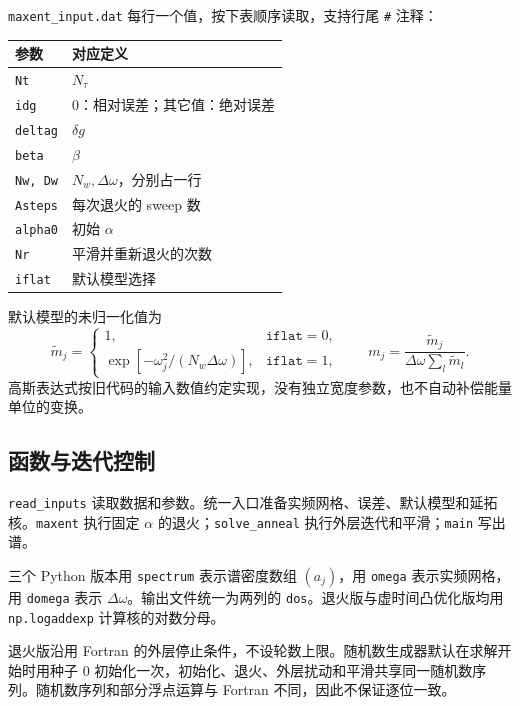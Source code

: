 \documentclass[UTF8,fontset=fandol,11pt]{ctexart}
\begin{document}
\texttt{maxent\_input.dat} 每行一个值，按下表顺序读取，支持行尾 \texttt{\#} 注释：
\begin{center}
    \begin{tabular}{ll}
        \toprule
        参数 & 对应定义\\
        \midrule
        \texttt{Nt} & $N_\tau$\\
        \texttt{idg} & 0：相对误差；其它值：绝对误差\\
        \texttt{deltag} & $\delta g$\\
        \texttt{beta} & $\beta$\\
        \texttt{Nw, Dw} & $N_w,\Delta\omega$，分别占一行\\
        \texttt{Asteps} & 每次退火的 sweep 数\\
        \texttt{alpha0} & 初始 $\alpha$\\
        \texttt{Nr} & 平滑并重新退火的次数\\
        \texttt{iflat} & 默认模型选择\\
        \bottomrule
    \end{tabular}
\end{center}
默认模型的未归一化值为
\begin{equation}
    \widetilde m_j=\begin{cases}1,&\texttt{iflat}=0,\\ \exp[-\omega_j^2/(N_w\Delta\omega)],&\texttt{iflat}=1,\end{cases}\qquad m_j=\frac{\widetilde m_j}{\Delta\omega\sum_l\widetilde m_l}.
\end{equation}
高斯表达式按旧代码的输入数值约定实现，没有独立宽度参数，也不自动补偿能量单位的变换。

\subsection{函数与迭代控制}
\texttt{read\_inputs} 读取数据和参数。统一入口准备实频网格、误差、默认模型和延拓核。\texttt{maxent} 执行固定 $\alpha$ 的退火；\texttt{solve\_anneal} 执行外层迭代和平滑；\texttt{main} 写出谱。

三个 Python 版本用 \texttt{spectrum} 表示谱密度数组 $(a_j)$，用 \texttt{omega} 表示实频网格，用 \texttt{domega} 表示 $\Delta\omega$。输出文件统一为两列的 \texttt{dos}。退火版与虚时间凸优化版均用 \texttt{np.logaddexp} 计算核的对数分母。

退火版沿用 Fortran 的外层停止条件，不设轮数上限。随机数生成器默认在求解开始时用种子 0 初始化一次，初始化、退火、外层扰动和平滑共享同一随机数序列。随机数序列和部分浮点运算与 Fortran 不同，因此不保证逐位一致。
\end{document}
